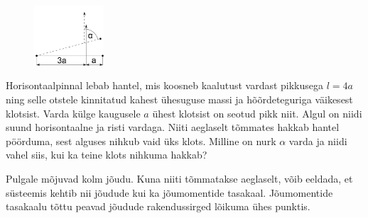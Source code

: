 
\begin{figure}%
\vspace{-5 pt}%
\includegraphics[width=0.23\textwidth]{2015-v3g-09-hantel}%
\vspace{-15 pt}%
\end{figure}
Horisontaalpinnal lebab hantel, mis koosneb kaalutust vardast pikkusega $l=4a$ ning selle otstele kinnitatud kahest ühesuguse massi ja hõõrdeteguriga väikesest klotsist. Varda külge kaugusele $a$ ühest klotsist on seotud pikk niit. Algul on niidi suund horisontaalne ja risti vardaga. Niiti aeglaselt tõmmates hakkab hantel pöörduma, sest alguses nihkub vaid üks klots. Milline on nurk $\alpha$ varda ja niidi vahel siis, kui ka teine klots nihkuma hakkab?


\hint
Pulgale mõjuvad kolm jõudu. Kuna niiti tõmmatakse aeglaselt, võib eeldada, et süsteemis kehtib nii jõudude kui ka jõumomentide tasakaal. Jõumomentide tasakaalu tõttu peavad jõudude rakendussirged lõikuma ühes punktis.

